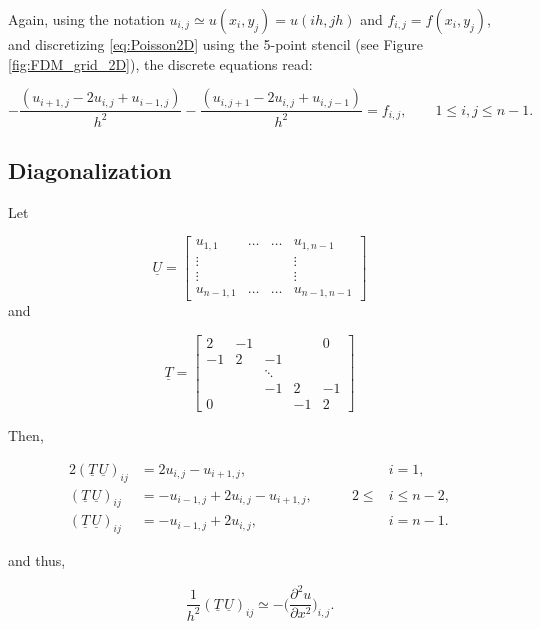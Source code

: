 \documentclass[11pt]{article}
\begin{document}
Again, using the notation $u_{i,j} \simeq u(x_i,y_j) = u(i h, j h)$ and $f_{i,j}=f(x_i,y_j)$,
and discretizing \eqref{eq:Poisson2D} using the 5-point stencil (see Figure \ref{fig:FDM_grid_2D}), the discrete equations read:

\begin{equation}
  -\frac{(u_{i+1,j}-2u_{i,j}+u_{i-1,j})}{h^2} - \frac{(u_{i,j+1}-2u_{i,j}+u_{i,j-1})}{h^2} = f_{i,j} ,\qquad 1 \leq i,j \leq n-1.
  \label{eq:FDM_sys}
\end{equation}

\subsection{Diagonalization}
Let 

\begin{equation*}
  \underline{{U}} = 
  \begin{bmatrix}
    u_{1,1} & \ldots & \ldots & u_{1,n-1} \\
    \vdots & & & \vdots \\
    \vdots & & & \vdots \\
    u_{n-1,1} & \ldots & \ldots & u_{n-1,n-1}
  \end{bmatrix}
\end{equation*}
and

\begin{equation*}
  \underline{{T}} = 
  \begin{bmatrix}
    2 & -1 & & & 0 \\
    -1 & 2 & -1 & & \\
    & & \ddots & & \\
    & & -1 & 2 & -1 \\
    0 & & & -1 & 2
  \end{bmatrix}
\end{equation*}

Then,

\begin{alignat*}{2}
  (\underline{{T}} \, \underline{{U}})_{ij} &= 2u_{i,j} - u_{i+1,j}, &\qquad &i=1, \\
  (\underline{{T}} \, \underline{{U}})_{ij} &= -u_{i-1,j}+2u_{i,j} - u_{i+1,j}, &\qquad 2 \leq &i \leq n-2, \\
  (\underline{{T}} \, \underline{{U}})_{ij} &= -u_{i-1,j}+2u_{i,j}, &\qquad &i=n-1.
\end{alignat*}

and thus,

\begin{equation}
  \boxed{\frac{1}{h^2} (\underline{{T}} \, \underline{{U}})_{ij} \simeq -\biggl( \frac{\partial^2 u}{\partial x^2} \biggr)_{i,j}. }
\end{equation}
\end{document}
